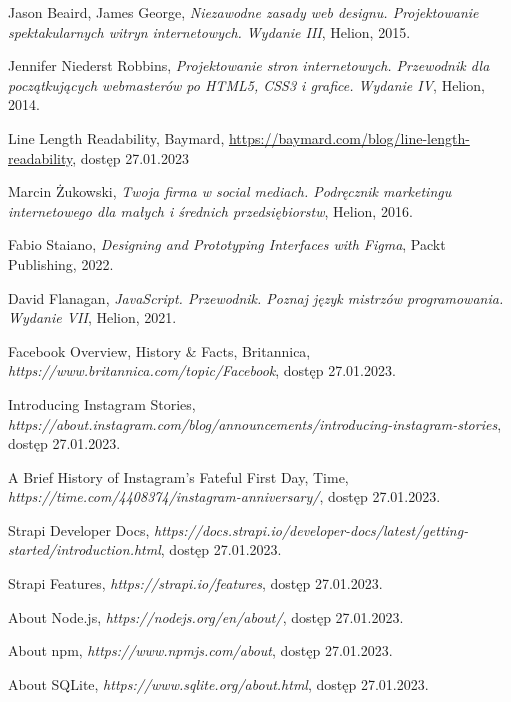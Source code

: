 \documentclass[12pt]{article}
\numberwithin{figure}{section}
\begin{document}
\begin{sloppypar}
\begin{thebibliography}{99}
    Jason Beaird, James George,
    \textit{Niezawodne zasady web designu. Projektowanie spektakularnych witryn internetowych. Wydanie III},
    Helion,
    2015.

    Jennifer Niederst Robbins,
    \textit{Projektowanie stron internetowych. Przewodnik dla początkujących webmasterów po HTML5, CSS3 i grafice. Wydanie IV},
    Helion,
    2014.

    Line Length Readability, Baymard,
    \url{https://baymard.com/blog/line-length-readability},
    dostęp 27.01.2023

    Marcin Żukowski,
    \textit{Twoja firma w social mediach. Podręcznik marketingu internetowego dla małych i średnich przedsiębiorstw},
    Helion,
    2016.

    Fabio Staiano,
    \textit{Designing and Prototyping Interfaces with Figma},
    Packt Publishing,
    2022.

    David Flanagan,
    \textit{JavaScript. Przewodnik. Poznaj język mistrzów programowania. Wydanie VII},
    Helion,
    2021.

    Facebook Overview, History \& Facts, Britannica,
    \textit{https://www.britannica.com/topic/Facebook},
    dostęp 27.01.2023.

    Introducing Instagram Stories,
    \textit{https://about.instagram.com/blog/announcements/introducing-instagram-stories},
    dostęp 27.01.2023.

    A Brief History of Instagram's Fateful First Day, Time,
    \textit{https://time.com/4408374/instagram-anniversary/},
    dostęp 27.01.2023.

    Strapi Developer Docs,
    \textit{https://docs.strapi.io/developer-docs/latest/getting-started/introduction.html},
    dostęp 27.01.2023.

    Strapi Features,
    \textit{https://strapi.io/features},
    dostęp 27.01.2023.

    About Node.js,
    \textit{https://nodejs.org/en/about/},
    dostęp 27.01.2023.

    About npm,
    \textit{https://www.npmjs.com/about},
    dostęp 27.01.2023.

    About SQLite,
    \textit{https://www.sqlite.org/about.html},
    dostęp 27.01.2023.


\end{thebibliography}
\end{sloppypar}
\end{document}
